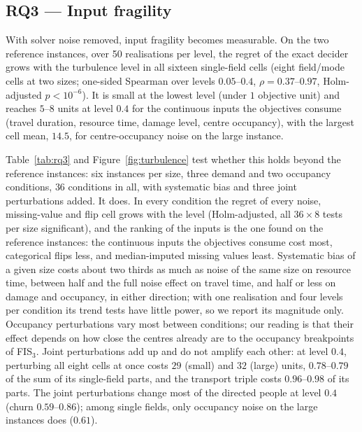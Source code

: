 \documentclass[systems,article,submit,moreauthors,pdftex]{Definitions/mdpi}
\begin{document}
\subsection{RQ3 --- Input fragility}\label{sec:rq3}
With solver noise removed, input fragility becomes measurable. On the two reference instances,
over 50 realisations per level, the regret of the exact decider grows with the turbulence level
in all sixteen single-field cells (eight field/mode cells at two sizes; one-sided Spearman over
levels $0.05$--$0.4$, $\rho = 0.37$--$0.97$, Holm-adjusted $p < 10^{-6}$). It is small at the
lowest level (under $1$ objective unit) and reaches $5$--$8$ units at level $0.4$ for the
continuous inputs the objectives consume (travel duration, resource time, damage level, centre
occupancy), with the largest cell mean, $14.5$, for centre-occupancy noise on the large instance.

Table~\ref{tab:rq3} and Figure~\ref{fig:turbulence} test whether this holds beyond the reference
instances: six instances per size, three demand and two occupancy conditions, $36$ conditions in
all, with systematic bias and three joint perturbations added. It does. In every condition the
regret of every noise, missing-value and flip cell grows with the level (Holm-adjusted, all
$36 \times 8$ tests per size significant), and the ranking of the inputs is the one found on the
reference instances: the continuous inputs the objectives consume cost most, categorical flips
less, and median-imputed missing values least. Systematic bias of a given size costs about two
thirds as much as noise of the same size on resource time, between half and the full noise effect on
travel time, and half or less on damage and occupancy, in either direction; with one realisation and four levels per condition its
trend tests have little power, so we report its magnitude only. Occupancy perturbations vary most
between conditions; our reading is that their effect depends on how close the centres already are
to the occupancy breakpoints of FIS$_3$. Joint perturbations add up and do not amplify each other: at level $0.4$, perturbing all
eight cells at once costs $29$ (small) and $32$ (large) units, $0.78$--$0.79$ of the sum of its
single-field parts, and the transport triple costs $0.96$--$0.98$ of its parts. The joint
perturbations change most of the directed people at level $0.4$ (churn $0.59$--$0.86$); among
single fields, only occupancy noise on the large instances does ($0.61$).
\end{document}
